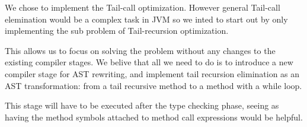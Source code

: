 We chose to implement the Tail-call optimization. However general Tail-call elemination would be a complex task in JVM so we inted to start out by only implementing the sub problem of Tail-recursion optimization.

This allows us to focus on solving the problem without any changes to the existing compiler stages. We belive that all we need to do is to introduce a new compiler stage for AST rewriting, and implement tail recursion elimination as an AST transformation: from a tail recursive method to a method with a while loop.

This stage will have to be executed after the type checking phase, seeing as having the method symbols attached to method call expressions would be helpful.
